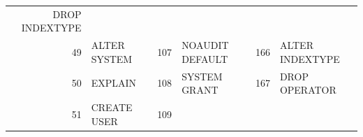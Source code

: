 \begin{appendix}
\begin{longtable}[]{@{}rl|rl|rl@{}}
\begin{minipage}[t]{0.24\columnwidth}
DROP INDEXTYPE\strut
\end{minipage}\tabularnewline
\begin{minipage}[t]{0.06\columnwidth}\raggedright\strut
49\strut
\end{minipage} & \begin{minipage}[t]{0.19\columnwidth}\raggedright\strut
ALTER SYSTEM\strut
\end{minipage} & \begin{minipage}[t]{0.06\columnwidth}\raggedright\strut
107\strut
\end{minipage} & \begin{minipage}[t]{0.24\columnwidth}\raggedright\strut
NOAUDIT DEFAULT\strut
\end{minipage} & \begin{minipage}[t]{0.06\columnwidth}\raggedright\strut
166\strut
\end{minipage} & \begin{minipage}[t]{0.24\columnwidth}\raggedright\strut
ALTER INDEXTYPE\strut
\end{minipage}\tabularnewline
\begin{minipage}[t]{0.06\columnwidth}\raggedright\strut
50\strut
\end{minipage} & \begin{minipage}[t]{0.19\columnwidth}\raggedright\strut
EXPLAIN\strut
\end{minipage} & \begin{minipage}[t]{0.06\columnwidth}\raggedright\strut
108\strut
\end{minipage} & \begin{minipage}[t]{0.24\columnwidth}\raggedright\strut
SYSTEM GRANT\strut
\end{minipage} & \begin{minipage}[t]{0.06\columnwidth}\raggedright\strut
167\strut
\end{minipage} & \begin{minipage}[t]{0.24\columnwidth}\raggedright\strut
DROP OPERATOR\strut
\end{minipage}\tabularnewline
\begin{minipage}[t]{0.06\columnwidth}\raggedright\strut
51\strut
\end{minipage} & \begin{minipage}[t]{0.19\columnwidth}\raggedright\strut
CREATE USER\strut
\end{minipage} & \begin{minipage}[t]{0.06\columnwidth}\raggedright\strut
109\strut
\end{minipage} & \begin{minipage}[t]{0.24\columnwidth}\raggedright\strut

\end{minipage}
\end{longtable}
\end{appendix}
